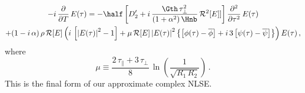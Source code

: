 \begin{multline} \label{eqn:mflt_nlsx}
    -i\, \frac{\partial}{\partial T}\, E(\tau) = -\half \left[ D_2^\prime + i\, \frac{\Gth\, \tau_\perp^2}{\left(1 + \alpha^2\right) \Hnb}\, \mathcal{R}^2[E]] \right] \frac{\partial^2}{\partial \tau^2}\, E(\tau) \\
    + (1 - i\, \alpha)\, \rho\,  \mathcal{R}[E] \left( i\, \left[\left|E(\tau)\right|^2 - 1\right] + \mu\, \mathcal{R}[E] \left|E(\tau)\right|^2 \left\{ \left[\phi(\tau) - \overline{\phi}\right] + i\, 3 \left[\psi(\tau) - \overline{\psi}\right] \right\} \right) E(\tau)\, ,
\end{multline}
where
\begin{equation}
    \label{eqn:mflt_mu_def} \mu \equiv \frac{2\, \tau_\parallel + 3\, \tau_\perp}{8}\, \ln\left(\frac{1}{\sqrt{R_1\, R_2}}\right)\, .
\end{equation}
This is the final form of our approximate complex NLSE.

